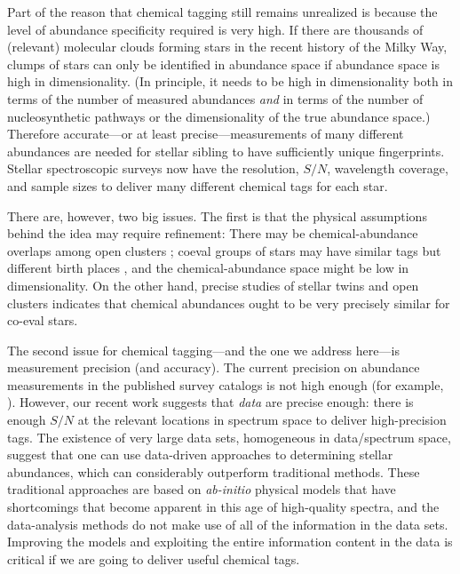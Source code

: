 \documentclass[12pt, letterpaper, preprint]{aastex}
\newcommand{\foreign}[1]{\textsl{#1}}
\begin{document}
Part of the reason that chemical tagging still remains unrealized
is because the level of abundance specificity required
is very high.
If there are thousands of (relevant) molecular clouds forming stars in
the recent history of the Milky Way, clumps of stars can only be
identified in abundance space if abundance space is high in dimensionality.
(In principle, it needs to be high in dimensionality both in terms
of the number of measured abundances \emph{and} in terms of the number of
nucleosynthetic pathways or the dimensionality of the true abundance
space.)
Therefore accurate---or at
least precise---measurements of many different abundances are needed
for stellar sibling to have sufficiently unique fingerprints.
Stellar spectroscopic surveys now have the resolution,
$S/N$, wavelength coverage, and sample sizes to deliver many
different chemical tags for each star.

There are, however, two big issues.
The first is that the physical assumptions behind the idea may require
refinement:
There may be chemical-abundance overlaps among open clusters
\citep{blancocuaresma}; coeval groups of stars may have similar tags
but different birth places \citep{mitschang}, and the
chemical-abundance space might be low in dimensionality.
On the other hand, precise studies of stellar twins \citep{melendez, jofre}
and open clusters \citep{bovy} indicates that chemical abundances ought to be
very precisely similar for co-eval stars.

The second issue for chemical tagging---and the one we address
here---is measurement precision (and accuracy).
The current precision on abundance measurements in the published
survey catalogs is not high enough (for example, \citealt{martell,
  ting}).
However, our recent work \citep{thecannon} suggests that \emph{data}
are precise enough: there is enough $S/N$ at the relevant
locations in spectrum space to deliver high-precision tags.
The existence of very large data sets, homogeneous in data/spectrum
space, suggest that one can use data-driven approaches to determining
stellar abundances, which can considerably outperform traditional
methods.
These traditional approaches are based on \foreign{ab-initio} physical models
that have shortcomings that become apparent in this age of
high-quality spectra, and the data-analysis methods do not make use of
all of the information in the data sets.
Improving the models and exploiting the entire information
content in the data is critical if we are going to deliver useful
chemical tags.
\end{document}
